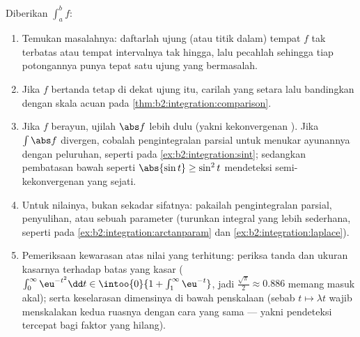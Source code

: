 \begin{method}\label{met:b2:integration:study}
Diberikan $\int_a^b f$:
\begin{enumerate}
  \item Temukan masalahnya: daftarlah ujung (atau titik dalam)
        tempat $f$ tak terbatas atau tempat intervalnya
        tak hingga, lalu pecahlah sehingga tiap potongannya punya
        tepat satu ujung yang bermasalah.
  \item Jika $f$ bertanda tetap di dekat ujung itu, carilah
        yang setara lalu bandingkan dengan skala acuan pada
        \cref{thm:b2:integration:comparison}.
  \item Jika $f$ berayun, ujilah $\abs f$ lebih dulu (yakni
        kekonvergenan ). Jika $\int\abs f$ divergen, cobalah
        pengintegralan parsial untuk menukar ayunannya dengan
        peluruhan, seperti pada \cref{ex:b2:integration:sint};
        sedangkan pembatasan bawah seperti $\abs{\sin t} \geq \sin^2t$
        mendeteksi semi-kekonvergenan yang sejati.
  \item Untuk nilainya, bukan sekadar sifatnya: pakailah
        pengintegralan parsial, penyulihan, atau sebuah parameter
        (turunkan integral yang lebih sederhana, seperti pada
        \cref{ex:b2:integration:arctanparam} dan
        \cref{ex:b2:integration:laplace}).
  \item Pemeriksaan kewarasan atas nilai yang terhitung: periksa
        tanda dan ukuran kasarnya terhadap batas yang kasar ($\int_0^\infty
        \eu^{-t^2}\dd t \in \intoo{0}{1 + \int_1^\infty
        \eu^{-t}}$, jadi $\frac{\sqrt\pi}{2} \approx 0.886$ memang
        masuk akal); serta keselarasan dimensinya di bawah penskalaan
        (sebab $t \mapsto \lambda t$ wajib menskalakan kedua ruasnya
        dengan cara yang sama --- yakni pendeteksi tercepat bagi faktor
        yang hilang).
\end{enumerate}
\end{method}

